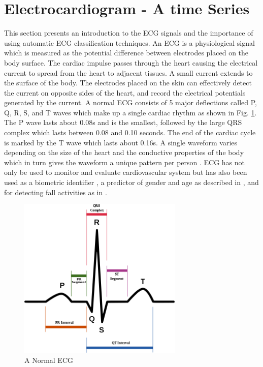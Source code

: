 \documentclass{ieeeaccess}
\newcommand{\todo}[1]{\textbf{\ \textcolor{red}{#1}}}
\begin{document}
\section{Electrocardiogram - A time Series}
This section presents an introduction to the ECG signals and the importance of using automatic ECG classification techniques.
An ECG is a physiological signal which is measured as the potential difference between electrodes placed on the body surface. The cardiac impulse passes through the heart causing the electrical current to spread
from the heart to adjacent tissues. A small current extends to the surface of the body. The electrodes placed on the skin can effectively detect the current on opposite sides of the heart, and record the electrical potentials generated by the current. A normal ECG consists of 5 major deflections called P, Q, R, S, and T waves which make up a single cardiac rhythm as shown in Fig. \ref{fig:ECG}. The P wave lasts about 0.08s and is the smallest, followed by the large QRS complex which lasts between 0.08 and 0.10 seconds. The end of the cardiac cycle is marked by the T wave which lasts about 0.16s. A single waveform varies depending on the size of the heart and the conductive properties of the body which in turn gives the waveform a unique pattern per person \cite{7164783}. ECG has not only be used to monitor and evaluate cardiovascular system but has also been used as a biometric identifier \cite{9123339}, a predictor of gender and age as described in \cite{cite-key}, and for detecting fall activities as in \cite{2021}.
\begin{figure}[ht]	
\caption{A Normal ECG} %
\label{fig:ECG}
\centerline{\includegraphics[width=18.5pc]{Definitions/ecgNormal.png}}
\end{figure}
\end{document}
